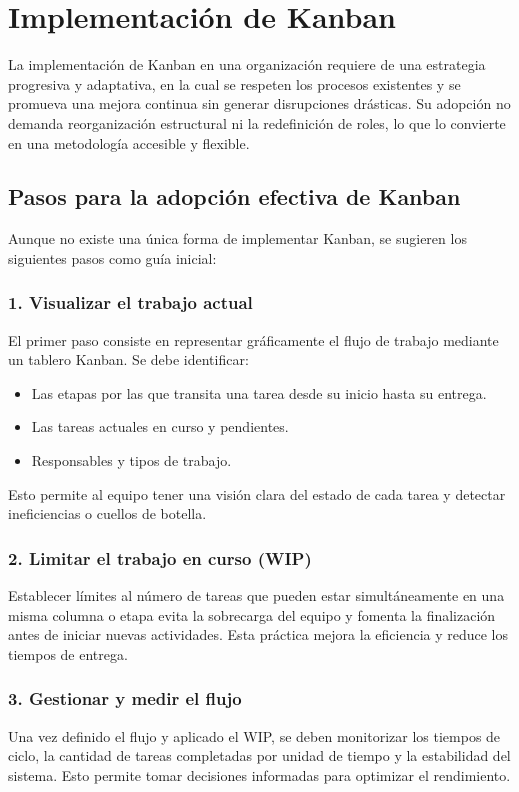 \section{Implementación de Kanban}

La implementación de Kanban en una organización requiere de una estrategia progresiva y adaptativa, en la cual se respeten los procesos existentes y se promueva una mejora continua sin generar disrupciones drásticas. Su adopción no demanda reorganización estructural ni la redefinición de roles, lo que lo convierte en una metodología accesible y flexible.

\subsection{Pasos para la adopción efectiva de Kanban}

Aunque no existe una única forma de implementar Kanban, se sugieren los siguientes pasos como guía inicial:

\subsubsection{1. Visualizar el trabajo actual}
El primer paso consiste en representar gráficamente el flujo de trabajo mediante un tablero Kanban. Se debe identificar:
\begin{itemize}
    \item Las etapas por las que transita una tarea desde su inicio hasta su entrega.
    \item Las tareas actuales en curso y pendientes.
    \item Responsables y tipos de trabajo.
\end{itemize}
Esto permite al equipo tener una visión clara del estado de cada tarea y detectar ineficiencias o cuellos de botella.

\subsubsection{2. Limitar el trabajo en curso (WIP)}
Establecer límites al número de tareas que pueden estar simultáneamente en una misma columna o etapa evita la sobrecarga del equipo y fomenta la finalización antes de iniciar nuevas actividades. Esta práctica mejora la eficiencia y reduce los tiempos de entrega.

\subsubsection{3. Gestionar y medir el flujo}
Una vez definido el flujo y aplicado el WIP, se deben monitorizar los tiempos de ciclo, la cantidad de tareas completadas por unidad de tiempo y la estabilidad del sistema. Esto permite tomar decisiones informadas para optimizar el rendimiento.

